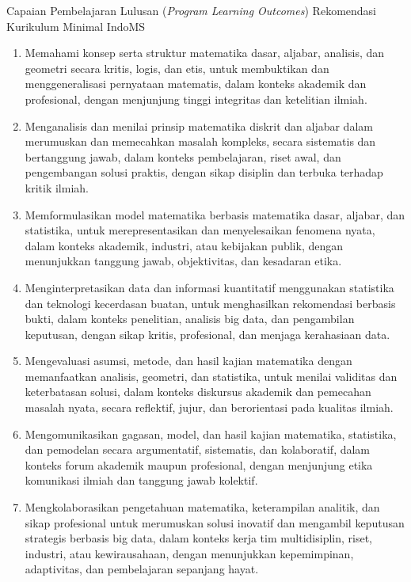 \documentclass[aspectratio=169,11pt]{beamer}
\begin{document}
\begin{frame}[allowframebreaks]{Capaian Pembelajaran Lulusan (\textit{Program Learning Outcomes}) Rekomendasi Kurikulum Minimal IndoMS}

\begin{enumerate}
\item Memahami konsep serta struktur matematika dasar, aljabar, analisis, dan geometri secara kritis, logis, dan etis, untuk membuktikan dan menggeneralisasi pernyataan matematis, dalam konteks akademik dan profesional, dengan menjunjung tinggi integritas dan ketelitian ilmiah.
\item Menganalisis dan menilai prinsip matematika diskrit dan aljabar dalam merumuskan dan memecahkan masalah kompleks, secara sistematis dan bertanggung jawab, dalam konteks pembelajaran, riset awal, dan pengembangan solusi praktis, dengan sikap disiplin dan terbuka terhadap kritik ilmiah.
\item Memformulasikan model matematika berbasis matematika dasar, aljabar, dan statistika, untuk merepresentasikan dan menyelesaikan fenomena nyata, dalam konteks akademik, industri, atau kebijakan publik, dengan menunjukkan tanggung jawab, objektivitas, dan kesadaran etika.
\item Menginterpretasikan data dan informasi kuantitatif menggunakan statistika dan teknologi kecerdasan buatan, untuk menghasilkan rekomendasi berbasis bukti, dalam konteks penelitian, analisis big data, dan pengambilan keputusan, dengan sikap kritis, profesional, dan menjaga kerahasiaan data.
\item Mengevaluasi asumsi, metode, dan hasil kajian matematika dengan memanfaatkan analisis, geometri, dan statistika, untuk menilai validitas dan keterbatasan solusi, dalam konteks diskursus akademik dan pemecahan masalah nyata, secara reflektif, jujur, dan berorientasi pada kualitas ilmiah.
\item Mengomunikasikan gagasan, model, dan hasil kajian matematika, statistika, dan pemodelan secara argumentatif, sistematis, dan kolaboratif, dalam konteks forum akademik maupun profesional, dengan menjunjung etika komunikasi ilmiah dan tanggung jawab kolektif.
\item Mengkolaborasikan pengetahuan matematika, keterampilan analitik, dan sikap profesional untuk merumuskan solusi inovatif dan mengambil keputusan strategis berbasis big data, dalam konteks kerja tim multidisiplin, riset, industri, atau kewirausahaan, dengan menunjukkan kepemimpinan, adaptivitas, dan pembelajaran sepanjang hayat.
\end{enumerate}

\end{frame}
\end{document}
